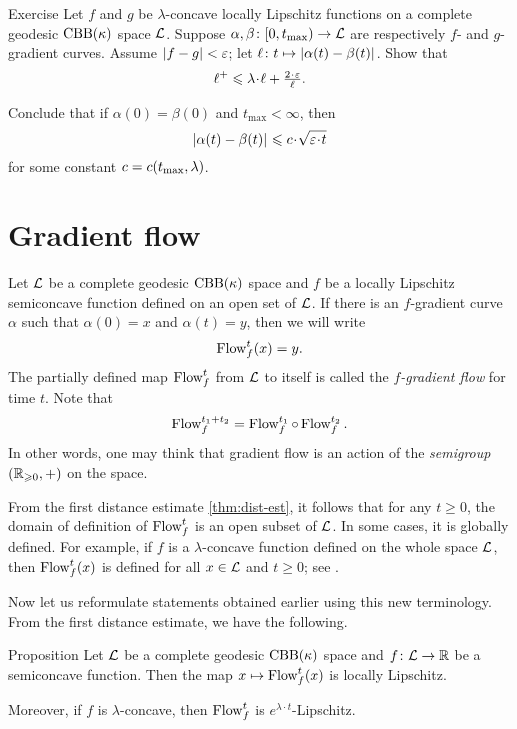 \begin{thm}{Exercise}\label{lem:fg-dist-est}
Let $f$ and $g$ be $\lambda$-concave locally Lipschitz functions on a complete geodesic $\mathrm{CBB}(\kappa)$ space $\mathcal{L}$.
Suppose
$\alpha,\beta\colon[0,t_{\max})\to \mathcal{L}$ are respectively $f$- and $g$-gradient curves.
Assume $|f-g|<\varepsilon$; let $\ell\:t\mapsto\dist{\alpha(t)}{\beta(t)}{}$.
Show that
\[\ell^+\le \lambda\cdot\ell+\tfrac{2\cdot\eps}{\ell}.\]

Conclude that if $\alpha(0)=\beta(0)$ and $t_{\max}<\infty$, then
\[\dist{\alpha(t)}{\beta(t)}{}
\le
\Const\cdot\sqrt{\eps\cdot t}\]
for some constant $c=c(t_{\max},\lambda)$.
\end{thm}

\section{Gradient flow}

Let $\mathcal{L}$ be a complete geodesic $\mathrm{CBB}(\kappa)$ space 
and $f$ be a locally Lipschitz semiconcave function defined on an open set of $\mathcal{L}$.
If there is an $f$-gradient curve $\alpha$ such that $\alpha(0)=x$ and $\alpha(t)=y$,
then we will write 
\[\mathop{\rm Flow}\nolimits^t_f(x)=y.\]
The partially defined map $\mathop{\rm Flow}\nolimits^t_f$ from $\mathcal{L}$ to itself is called the \emph{$f$-gradient flow} for time $t$.
Note that
\[\mathop{\rm Flow}\nolimits^{t_1+t_2}_f=\mathop{\rm Flow}\nolimits_f^{t_1}\circ\mathop{\rm Flow}\nolimits_f^{t_2}.\]
In other words, one may think that gradient flow is an action of the \textit{semigroup} $(\mathbb{R}_{\geqslant0},+)$ on the space.
 
From the first distance estimate \ref{thm:dist-est}, 
it follows that for any $t\ge 0$, the domain of definition of $\mathop{\rm Flow}\nolimits^t_f$ is an open subset of $\mathcal{L}$.
In some cases, it is globally defined.
For example, if $f$ is a $\lambda$-concave function defined on the whole space $\mathcal{L}$, then $\mathop{\rm Flow}\nolimits^t_f(x)$ is defined for all $x\in \mathcal{L}$ and $t\ge0$;
see \cite[16.19]{alexander-kapovitch-petrunin2024}.

Now let us reformulate statements obtained earlier using this new terminology.
From the first distance estimate, we have the following.

\begin{thm}{Proposition}\label{prop:GF-is-lip}
Let $\mathcal{L}$ be a complete geodesic $\mathrm{CBB}(\kappa)$ space 
and $f\colon\mathcal{L}\to \mathbb{R}$ be a semiconcave function.
Then the map $x\mapsto\mathop{\rm Flow}\nolimits^t_f(x)$ is locally Lipschitz.

Moreover, if $f$ is $\lambda$-concave, then $\mathop{\rm Flow}\nolimits^t_f$ is $e^{\lambda\cdot t}$-Lipschitz.
\end{thm}

